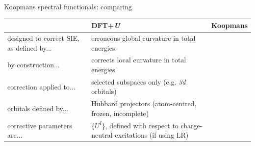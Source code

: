 \documentclass[xcolor=table,aspectratio=169]{beamer}
\numberwithin{equation}{section}
\begin{document}
\begin{frame}{Koopmans spectral functionals: comparing}
   \small
   \renewcommand{\arraystretch}{1.5}
   \begin{tabularx}{\columnwidth}{L L L}
                                                & \textbf{DFT+\emph{U}}                                                       & \textbf{Koopmans}                                                                                                           \\
      \hline
      designed to correct SIE, as defined by... & erroneous global curvature in total energies                                & \leavevmode{}                                                 \\
      by construction...                        & corrects local curvature in total energies                                  & \leavevmode{} \\
      correction applied to...                  & selected subspaces only (e.g. \emph{3d} orbitals)                           & \leavevmode{}                                                                                  \\
      orbitals defined by...                    & Hubbard projectors (atom-centred, frozen, incomplete)                       &                                                                                                                             \\
      corrective parameters are...              & $\{U^I\}$, defined with respect to charge-neutral excitations (if using LR) &
   \end{tabularx}
\end{frame}
\end{document}
